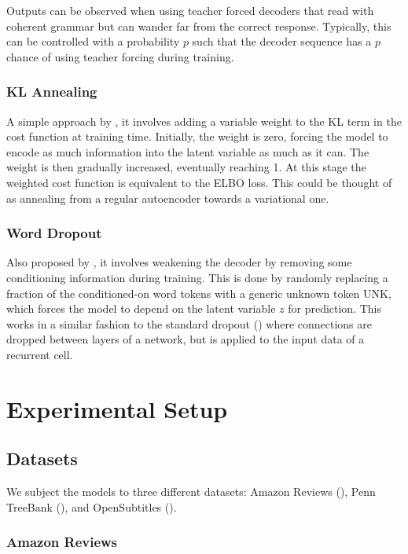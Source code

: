 \documentclass[12pt,twoside]{report}
\begin{document}
Outputs can be observed when using teacher forced decoders that read with coherent grammar but can wander far from the correct response. Typically, this can be controlled with a probability $p$ such that the decoder sequence has a $p$ chance of using teacher forcing during training.

\subsection{KL Annealing}

A simple approach by \cite{bowman_generating_2015}, it involves adding a variable weight to the KL term in the cost function at training time. Initially, the weight is zero, forcing the model to encode as much information into the latent variable as much as it can. The weight is then gradually increased, eventually reaching 1. At this stage the weighted cost function is equivalent to the ELBO loss. This could be thought of as annealing from a regular autoencoder towards a variational one.

\subsection{Word Dropout}
Also proposed by \cite{bowman_generating_2015}, it involves weakening the decoder by removing some conditioning information during training. This is done by randomly replacing a fraction of the conditioned-on word tokens with a generic unknown token UNK, which forces the model to depend on the latent variable $z$ for prediction. This works in a similar fashion to the standard dropout (\cite{srivastava_dropout:_2014}) where connections are dropped between layers of a network, but is applied to the input data of a recurrent cell.

\chapter{Experimental Setup}


\section{Datasets}

We subject the models to three different datasets: Amazon Reviews (\cite{he_ups_2016}), Penn TreeBank (\cite{marcus_building_2002}), and OpenSubtitles (\cite{lison_opensubtitles2016:_2016}).

\subsection{Amazon Reviews}
\end{document}
